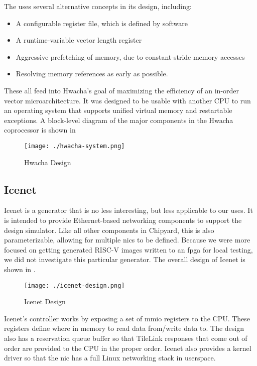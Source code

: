 The  uses several alternative concepts in its design, including:
\begin{itemize}
\item A configurable register file, which is defined by software
\item A runtime-variable vector length register
\item Aggressive prefetching of memory, due to constant-stride memory accesses
\item Resolving memory references as early as possible.
\end{itemize}

These all feed into Hwacha's goal of maximizing the efficiency of an in-order vector microarchitecture.
It was designed to be usable with another CPU to run an operating system that supports unified virtual memory and restartable exceptions.
A block-level diagram of the major components in the Hwacha coprocessor is shown in 

\begin{figure}[h!tbp]
  \centering
  \texttt{[image: ./hwacha-system.png]}
  \caption{Hwacha Design~\cite[p.~11]{hwachaPresentation}}
  \label{fig:Hwacha_Accelerator}
\end{figure}

\subsection{Icenet}\label{sec:Icenet_Generator}
\nocite{icenetGithub}
Icenet is a \gls{generator} that is no less interesting, but less applicable to our uses.
It is intended to provide Ethernet-based networking components to support the  design simulator.
Like all other components in Chipyard, this is also parameterizable, allowing for multiple \Glspl{nic} to be defined.
Because we were more focused on getting generated RISC-V images written to an \Gls{fpga} for local testing, we did not investigate this particular generator.
The overall design of Icenet is shown in .

\begin{figure}[h!tbp]
  \centering
  \texttt{[image: ./icenet-design.png]}
  \caption{Icenet Design}
  \label{fig:Icenet_Generator}
\end{figure}

Icenet's controller works by exposing a set of \gls{mmio} registers to the CPU.\@
These registers define where in memory to read data from/write data to.
The design also has a reservation queue buffer so that TileLink responses that come out of order are provided to the CPU in the proper order.
Icenet also provides a kernel driver so that the \gls{nic} has a full Linux networking stack in userspace.


